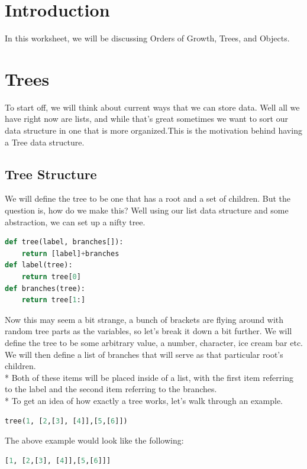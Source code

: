 \documentclass{article}
\begin{document}
\maketitle
\section{Introduction}
In this worksheet, we will be discussing Orders of Growth, Trees, and Objects. 
\section{Trees}
To start off, we will think about current ways that we can store data. Well all we have right now are lists, and while that's great sometimes we want to sort our data structure in one that is more organized.This is the motivation behind having a Tree data structure. 
\subsection{Tree Structure}
We will define the tree to be one that has a root and a set of children. But the question is, how do we make this? Well using our list data structure and some abstraction, we can set up a nifty tree. 
\begin{lstlisting}[language = Python]
def tree(label, branches[]):
    return [label]+branches
def label(tree):
    return tree[0]
def branches(tree):
    return tree[1:]
\end{lstlisting}
Now this may seem a bit strange, a bunch of brackets are flying around with random tree parts as the variables, so let's break it down a bit further. We will define the tree to be some arbitrary value, a number, character, ice cream bar etc. We will then define a list of branches that will serve as that particular root's children. \\*
\bigskip
Both of these items will be placed inside of a list, with the first item referring to the label and the second item referring to the branches. \\*
\bigskip
To get an idea of how exactly a tree works, let's walk through an example.
\begin{lstlisting}[language = Python]
tree(1, [2,[3], [4]],[5,[6]])
\end{lstlisting}
The above example would look like the following:
\begin{lstlisting}[language = Python]
[1, [2,[3], [4]],[5,[6]]]
\end{lstlisting}
\end{document}
